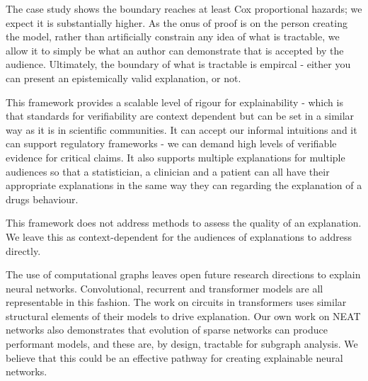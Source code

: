 \documentclass{article}
\begin{document}
The case study shows the boundary reaches at least Cox proportional hazards; we expect it is substantially higher. As the onus of proof is on the person creating the model, rather than artificially constrain any idea of what is tractable, we allow it to simply be what an author can demonstrate that is accepted by the audience. Ultimately, the boundary of what is tractable is empircal - either you can present an epistemically valid explanation, or not.

This framework provides a scalable level of rigour for explainability - which is that standards for verifiability are context dependent but can be set in a similar way as it is in scientific communities. It can accept our informal intuitions and it can support regulatory frameworks - we can demand high levels of verifiable evidence for critical claims. It also supports multiple explanations for multiple audiences so that a statistician, a clinician and a patient can all have their appropriate explanations in the same way they can regarding the explanation of a drugs behaviour.



This framework does not address methods to assess the quality of an explanation. We leave this as context-dependent for the audiences of explanations to address directly.

The use of computational graphs leaves open future research directions to explain neural networks. Convolutional, recurrent and transformer models are all representable in this fashion. The work on circuits in transformers \cite{olah2020zoom} uses similar structural elements of their models to drive explanation. Our own work on NEAT networks also demonstrates that evolution of sparse networks can produce performant models, and these are, by design, tractable for subgraph analysis. We believe that this could be an effective pathway for creating explainable neural networks.
\end{document}
